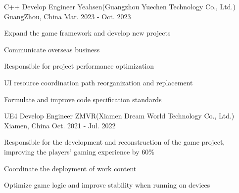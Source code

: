 

\begin{cventries}

  \cventry
    {C++ Develop Engineer} %
    {Yeahsen(Guangzhou Yuechen Technology Co., Ltd.)} %
    {GuangZhou, China} %
    {Mar. 2023 - Oct. 2023} %
    {
      \begin{cvitems} %
        \item {Expand the game framework and develop new projects} 
        \item {Communicate overseas business} 
        \item {Responsible for project performance optimization} 
        \item {UI resource coordination path reorganization and replacement} 
        \item {Formulate and improve code specification standards} 
      \end{cvitems}
    }

  \cventry
    {UE4 Develop Engineer} %
    {ZMVR(Xiamen Dream World Technology Co., Ltd.)} %
    {Xiamen, China} %
    {Oct. 2021 - Jul. 2022} %
    {
      \begin{cvitems} %
        \item {Responsible for the development and reconstruction of the game project, improving the players' gaming experience by 60\%} 
        \item {Coordinate the deployment of work content} 
        \item {Optimize game logic and improve stability when running on devices} 
      \end{cvitems}
    }

\end{cventries}
